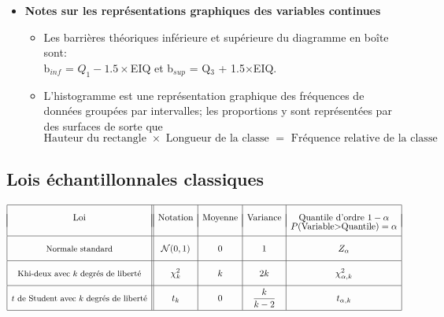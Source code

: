 \documentclass[12pt,french]{article}
\begin{document}
\begin{itemize}
\item {\bf Notes sur les représentations graphiques des variables continues}
\begin{itemize}

\item
Les barrières théoriques inférieure et supérieure du diagramme en boîte sont:\\
b$_{inf}$ = $Q_1 - 1.5\times$EIQ et b$_{sup}$ = Q$_3$ + 1.5$\times$EIQ. 
\item
L'histogramme est une représentation graphique des fréquences de données groupées par intervalles; les proportions y sont
représentées par des surfaces de sorte que
\vspace{-0.15cm}
$$ \mbox{Hauteur du rectangle } \times \mbox{ Longueur de la classe } = \mbox{ Fréquence relative de la classe} $$
\end{itemize}
\end{itemize}

\vspace{-0.3in}

\subsection*{Lois échantillonnales classiques}

{\small
\begin{displaymath}
{\renewcommand{\arraystretch}{2}
\begin{array}{|c||c|c|c|c|}
\hline
\mbox{Loi}& \mbox{Notation}& \mbox{Moyenne}& \mbox{Variance} &
\mbox{Quantile d'ordre }1-\alpha\\[-0.5cm]
&&&&P\mbox{(Variable$>$Quantile)}=\alpha\\
\hline
\mbox{\small Normale standard} & \displaystyle \mathcal{N}(0,1)
& \displaystyle 0
& \displaystyle 1
& \displaystyle Z_{\alpha}
\\[.10cm]
\hline
\mbox{\small Khi-deux avec $k$ degrés de liberté}
& \displaystyle \chi^2_k
& \displaystyle k
& \displaystyle 2k
& \displaystyle \chi^2_{\alpha,k}
\\[.10cm]
\hline
\mbox{\small $t$ de Student avec $k$ degrés de liberté} &
\displaystyle t_k & \displaystyle 0
& \displaystyle \frac{k}{k-2} & \displaystyle t_{\alpha,k}
\\[.10cm]
\hline
\end{array}}
\end{displaymath}
}
\end{document}
